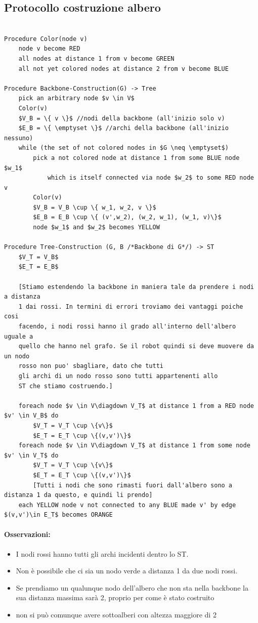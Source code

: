 \subsection{Protocollo costruzione albero}

\begin{lstlisting}

Procedure Color(node v)
	node v become RED
	all nodes at distance 1 from v become GREEN
	all not yet colored nodes at distance 2 from v become BLUE
	
Procedure Backbone-Construction(G) -> Tree
	pick an arbitrary node $v \in V$
	Color(v)
	$V_B = \{ v \}$ //nodi della backbone (all'inizio solo v)
	$E_B = \{ \emptyset \}$ //archi della backbone (all'inizio nessuno)
	while (the set of not colored nodes in $G \neq \emptyset$)
		pick a not colored node at distance 1 from some BLUE node $w_1$ 
			which is itself connected via node $w_2$ to some RED node v
		Color(v)
		$V_B = V_B \cup \{ w_1, w_2, v \}$
		$E_B = E_B \cup \{ (v',w_2), (w_2, w_1), (w_1, v)\}$
		node $w_1$ and $w_2$ becomes YELLOW
		
Procedure Tree-Construction (G, B /*Backbone di G*/) -> ST
	$V_T = V_B$
	$E_T = E_B$
	
	[Stiamo estendendo la backbone in maniera tale da prendere i nodi a distanza
    1 dai rossi. In termini di errori troviamo dei vantaggi poiche cosi
	facendo, i nodi rossi hanno il grado all'interno dell'albero uguale a
    quello che hanno nel grafo. Se il robot quindi si deve muovere da un nodo
    rosso non puo' sbagliare, dato che tutti 
    gli archi di un nodo rosso sono tutti appartenenti allo
    ST che stiamo costruendo.]
	
	foreach node $v \in V\diagdown V_T$ at distance 1 from a RED node $v' \in V_B$ do
		$V_T = V_T \cup \{v\}$
		$E_T = E_T \cup \{(v,v')\}$
	foreach node $v \in V\diagdown V_T$ at distance 1 from some node $v' \in V_T$ do
		$V_T = V_T \cup \{v\}$
		$E_T = E_T \cup \{(v,v')\}$ 
		[Tutti i nodi che sono rimasti fuori dall'albero sono a distanza 1 da questo, e quindi li prendo]
    each YELLOW node v not connected to any BLUE made v' by edge $(v,v')\in E_T$ becomes ORANGE
\end{lstlisting}

\paragraph{Osservazioni:}
\begin{itemize}
    \item I nodi rossi hanno tutti gli archi incidenti dentro lo ST.
    \item Non è possibile che ci sia un nodo verde a distanza 1 da due nodi rossi.
    \item Se prendiamo un qualunque nodo dell'albero che non sta nella backbone la
          sua distanza massima sarà 2, proprio per come è stato costruito
    \item non si può comunque avere sottoalberi con altezza maggiore di 2
\end{itemize}

